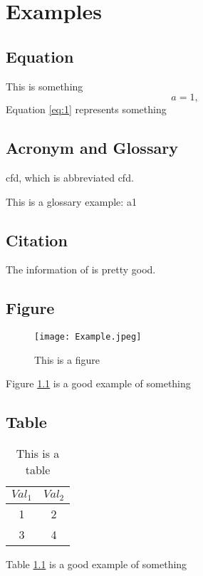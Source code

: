 \chapter{Examples}
\lipsum[1-2]

\section{Equation}
This is something
\begin{equation}
    a = 1,
\end{equation} \label{eq:1}
Equation \eqref{eq:1} represents something

\section{Acronym and Glossary}
\acrlong{cfd}, which is abbreviated \acrshort{cfd}. 

This is a glossary example: \gls{a1}

\newpage
\section{Citation}
The information of \cite{Lima_Thesis} is pretty good.

\section{Figure}
\begin{figure}[h]
    \centering
    \texttt{[image: Example.jpeg]}
    \caption{This is a figure}
    \label{fig:1}
\end{figure}

Figure \ref{fig:1} is a good example of something

\section{Table}
\begin{table}[h]
    \centering
    \caption{This is a table}
    \vspace*{2mm}
    \begin{tabular}{cc}
        \hline
        $Val_1$ & $Val_2$ \\
        \hline
        1 & 2 \\
        3 & 4 \\
        \hline
    \end{tabular}
    \label{tab:1}
\end{table}

Table \ref{tab:1} is a good example of something